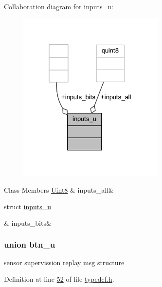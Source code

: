 Collaboration diagram for inputs\+\_\+u\+:
\nopagebreak
\begin{figure}[H]
\begin{center}
\leavevmode
\includegraphics[width=208pt]{d1/da8/a00230}
\end{center}
\end{figure}
\begin{DoxyFields}{Class Members}
\hypertarget{a00001_aca53c810e2c03754ba59d72154b67e40}{\hyperlink{a00001_a979e3e23b9a449e69ab6a8a83b6042f8}{Uint8}}\label{a00001_aca53c810e2c03754ba59d72154b67e40}
&
inputs\+\_\+all&
\\
\hline

\hypertarget{a00001_a166fc0b4af52a67e48789600d74b7280}{struct \hyperlink{a00001_d2/d1f/a00083}{inputs\+\_\+u}}\label{a00001_a166fc0b4af52a67e48789600d74b7280}
&
inputs\+\_\+bits&
\\
\hline

\end{DoxyFields}
\label{d7/df7/a00058}
\hypertarget{a00001_d7/df7/a00058}{}
\subsubsection{union btn\+\_\+u}
sensor supervission replay msg structure 

Definition at line \hyperlink{a00001_source_l00052}{52} of file \hyperlink{a00001_source}{typedef.\+h}.



